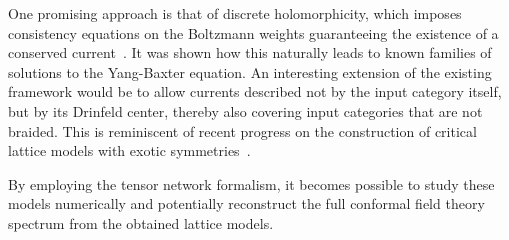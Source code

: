 One promising approach is that of discrete holomorphicity, which imposes consistency equations on the Boltzmann weights guaranteeing the existence of a conserved current~\cite{Fendley2020}. It was shown how this naturally leads to known families of solutions to the Yang-Baxter equation. An interesting extension of the existing framework would be to allow currents described not by the input category itself, but by its Drinfeld center, thereby also covering input categories that are not braided. This is reminiscent of recent progress on the construction of critical lattice models with exotic symmetries~\cite{Huang2021,Vanhove2021b}.

By employing the tensor network formalism, it becomes possible to study these models numerically and potentially reconstruct the full conformal field theory spectrum from the obtained lattice models.


